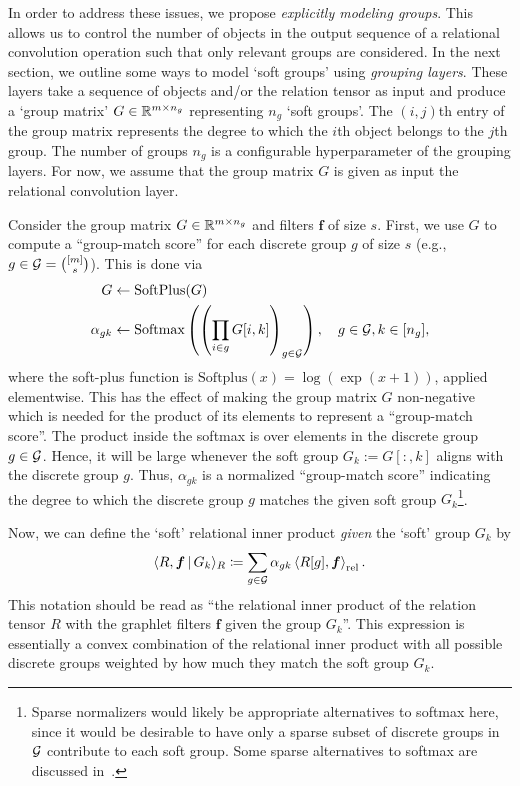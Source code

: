 In order to address these issues, we propose \textit{explicitly modeling groups}. This allows us to control the number of objects in the output sequence of a relational convolution operation such that only relevant groups are considered. In the next section, we outline some ways to model `soft groups' using \textit{grouping layers}. These layers take a sequence of objects and/or the relation tensor as input and produce a `group matrix' $G \in \mathbb{R}^{m \times n_g}$ representing $n_g$ `soft groups'. The $(i,j)$th entry of the group matrix represents the degree to which the $i$th object belongs to the $j$th group. The number of groups $n_g$ is a configurable hyperparameter of the grouping layers. For now, we assume that the group matrix $G$ is given as input the relational convolution layer.

Consider the group matrix $G \in \mathbb{R}^{m \times n_g}$ and filters $\bm{f}$ of size $s$. First, we use $G$ to compute a ``group-match score'' for each discrete group $g$ of size $s$ (e.g., $g \in {\mathcal{G}} = \binom{[m]}{s}$). This is done via
\begin{equation}\label{eq:group_match_score}
    \begin{split}
        G &\gets \text{SoftPlus}(G)\\
        \alpha_{gk} &\gets \text{Softmax}\left(\left(\prod_{i \in g} G[i,k]\right)_{g \in {\mathcal{G}}}\right), \quad g \in {\mathcal{G}}, k \in [n_g],
    \end{split}
\end{equation}
where the soft-plus function is $\text{Softplus}(x) = \log(\exp(x + 1))$, applied elementwise. This has the effect of making the group matrix $G$ non-negative which is needed for the product of its elements to represent a ``group-match score''. The product inside the softmax is over elements in the discrete group $g \in {\mathcal{G}}$. Hence, it will be large whenever the soft group $G_k := G[:, k]$ aligns with the discrete group $g$. Thus, $\alpha_{gk}$ is a normalized ``group-match score'' indicating the degree to which the discrete group $g$ matches the given soft group $G_k$\footnote{Sparse normalizers would likely be appropriate alternatives to softmax here, since it would be desirable to have only a sparse subset of discrete groups in ${\mathcal{G}}$ contribute to each soft group. Some sparse alternatives to softmax are discussed in~\citep{lahaControllableSparseAlternatives2018a}.}. %

Now, we can define the `soft' relational inner product \textit{given} the `soft' group $G_k$ by
\begin{equation}\label{eq:soft_relational_inner_prod}
    \langle R, \boldsymbol{f} \, \vert \, G_k \rangle_R \coloneqq \sum_{g \in {\mathcal{G}}} \alpha_{gk} \left \langle R[g], \boldsymbol{f} \right\rangle_\mathrm{rel}.
\end{equation}
This notation should be read as ``the relational inner product of the relation tensor $R$ with the graphlet filters $\boldsymbol{f}$ given the group $G_k$''. This expression is essentially a convex combination of the relational inner product with all possible discrete groups weighted by how much they match the soft group $G_k$.

